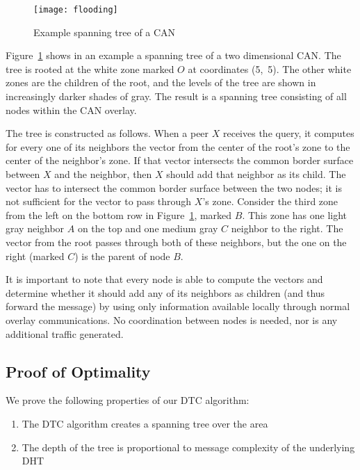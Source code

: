 \documentclass[fleqn,12pt,twoside]{article}
\begin{document}
\begin{figure}[!tb]
  \centering
  \texttt{[image: flooding]}
  \caption{Example spanning tree of a CAN}
  \label{fig:flooding}
  \vskip -5mm
\end{figure}

Figure~\ref{fig:flooding} shows in an example a spanning tree of a two dimensional CAN. 
The tree is rooted at the white zone marked $O$ at coordinates (5,~5). The other white zones are
the children of the root, and the levels of the tree are shown in
increasingly darker shades of gray. The result is a spanning tree
consisting of all nodes within the CAN overlay.

The tree is constructed as follows.  When a peer $X$ receives the
query, it computes for every one of its neighbors the vector from the
center of the root's zone to the center of the neighbor's zone. If
that vector intersects the common border surface between $X$ and the
neighbor, then $X$ should add that neighbor as its child. The vector
has to intersect the common border surface between the two nodes; it
is not sufficient for the vector to pass through $X$'s zone. Consider
the third zone from the left on the bottom row in
Figure~\ref{fig:flooding}, marked $B$. This zone has one light gray
neighbor $A$ on the top and one medium gray $C$ neighbor to the right.
The vector from the root passes through both of these neighbors, but
the one on the right (marked $C$) is the parent of node $B$.

It is important to note that every node is able to compute the vectors
and determine whether it should add any of its neighbors as children
(and thus forward the message) by using only information available
locally through normal overlay communications.  No coordination
between nodes is needed, nor is any additional traffic generated.


\subsection{Proof of Optimality}
\label{sec:proof-optimality}

We prove the following properties of our DTC algorithm:
\begin{enumerate}

\item The DTC algorithm creates a spanning tree over the area
\item The depth of the tree is proportional to message complexity of the
  underlying DHT
\end{enumerate}
\end{document}
